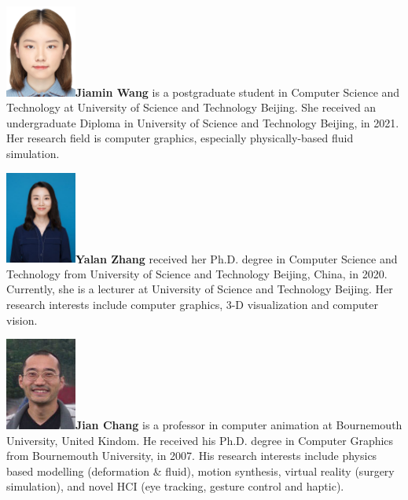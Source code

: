 \documentclass[VANCOUVER,STIX1COL]{WileyNJD-v2}
\begin{document}
\vspace{1.3ex}

\begin{biography}{\includegraphics[width=66pt,height=86pt]{VANCOUVER/figure/photos/JiaminWang.jpg}}{\textbf{Jiamin Wang} is a postgraduate student in Computer Science and Technology at University of Science and Technology Beijing. She received an undergraduate Diploma in University of Science and Technology Beijing, in 2021. Her research field is computer graphics, especially physically-based fluid simulation.}
\end{biography}

\vspace{7ex}

\begin{biography}{\includegraphics[width=66pt,height=86pt]{VANCOUVER/figure/photos/YalanZhang.jpg}}{\textbf{Yalan Zhang} received her Ph.D. degree in Computer Science and Technology from University of Science and Technology Beijing, China, in 2020. Currently, she is a lecturer at University of Science and Technology Beijing. Her research interests include computer graphics, 3-D visualization and computer vision.}
\end{biography}

\vspace{7ex}

\begin{biography}{\includegraphics[width=66pt,height=86pt]{VANCOUVER/figure/photos/JianChang.jpg}}{\textbf{Jian Chang} is a professor in  computer animation at Bournemouth University, United Kindom. He received his Ph.D. degree in Computer Graphics from Bournemouth University, in 2007. His research interests include physics based modelling (deformation \& fluid), motion synthesis, virtual reality (surgery simulation), and novel HCI (eye tracking, gesture control and haptic).}
\end{biography}

\vspace{5ex}
\end{document}

